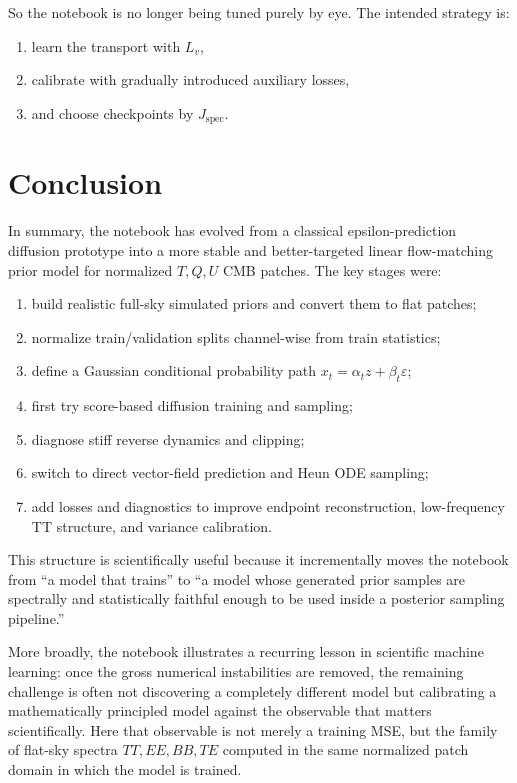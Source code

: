 \documentclass[11pt]{article}
\newcommand{\e}{\varepsilon}
\begin{document}
So the notebook is no longer being tuned purely by eye. The intended strategy is:
\begin{enumerate}[leftmargin=1.5em]
  \item learn the transport with \(L_v\),
  \item calibrate with gradually introduced auxiliary losses,
  \item and choose checkpoints by \(J_{\mathrm{spec}}\).
\end{enumerate}

\section{Conclusion}

In summary, the notebook has evolved from a classical epsilon-prediction diffusion prototype into a more stable and better-targeted linear flow-matching prior model for normalized \(T,Q,U\) CMB patches. The key stages were:
\begin{enumerate}[leftmargin=1.5em]
  \item build realistic full-sky simulated priors and convert them to flat patches;
  \item normalize train/validation splits channel-wise from train statistics;
  \item define a Gaussian conditional probability path \(x_t=\alpha_t z + \beta_t\e\);
  \item first try score-based diffusion training and sampling;
  \item diagnose stiff reverse dynamics and clipping;
  \item switch to direct vector-field prediction and Heun ODE sampling;
  \item add losses and diagnostics to improve endpoint reconstruction, low-frequency TT structure, and variance calibration.
\end{enumerate}

This structure is scientifically useful because it incrementally moves the notebook from ``a model that trains'' to ``a model whose generated prior samples are spectrally and statistically faithful enough to be used inside a posterior sampling pipeline.''

More broadly, the notebook illustrates a recurring lesson in scientific machine learning: once the gross numerical instabilities are removed, the remaining challenge is often not discovering a completely different model but calibrating a mathematically principled model against the observable that matters scientifically. Here that observable is not merely a training MSE, but the family of flat-sky spectra \(TT,EE,BB,TE\) computed in the same normalized patch domain in which the model is trained.
\end{document}
